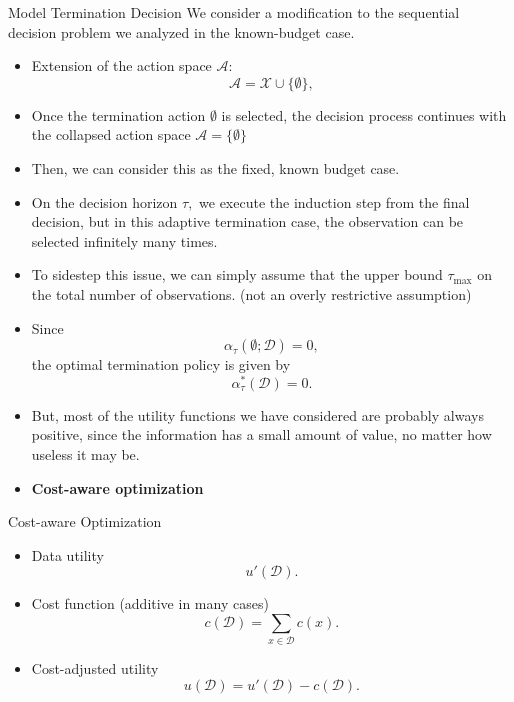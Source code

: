 \documentclass[9pt]{beamer}
\begin{document}
\begin{frame}{Model Termination Decision}
  We consider a modification to the sequential decision problem we analyzed in the known-budget case.
  \begin{itemize}
    \item Extension of the action space $\mathcal{A}:$
    \[
      \mathcal{A} = \mathcal{X} \cup \{\emptyset\},
    \]
    \item Once the termination action $\emptyset$ is selected, the decision process continues with the collapsed action space $\mathcal{A} = \{\emptyset\}$
    \item[$\Rightarrow$] Then, we can consider this as the fixed, known budget case.
    \vspace{1.0em}
    \item On the decision horizon $\tau,$ we execute the induction step from the final decision, but in this adaptive termination case, 
    the observation can be selected infinitely many times.
    \item[$\Rightarrow$] To sidestep this issue, we can simply assume that the upper bound $\tau_\text{max}$ on the total number of observations. 
    (not an overly restrictive assumption)
  \end{itemize}
\end{frame}

\begin{frame}
  \begin{itemize}
    \item Since 
    \[
      \alpha_\tau(\emptyset; \mathcal{D}) = 0,
    \]
    the optimal termination policy is given by
    \[
      \alpha_\tau^*(\mathcal{D}) = 0.
    \]
    \item But, most of the utility functions we have considered are probably always positive,
    since the information has a small amount of value, no matter how useless it may be.
    \item[$\Rightarrow$] \textbf{Cost-aware optimization}
  \end{itemize}
\end{frame}

\begin{frame}{Cost-aware Optimization}
  \begin{itemize}
    \item Data utility
    \[
      u'(\mathcal{D}).
    \]
    \item Cost function (additive in many cases)
    \[
      c(\mathcal{D}) = \sum_{x \in \mathcal{D}} c(x).
    \]
    \item Cost-adjusted utility
    \[
      u(\mathcal{D}) = u'(\mathcal{D}) - c(\mathcal{D}).
    \]
  \end{itemize}
\end{frame}
\end{document}
